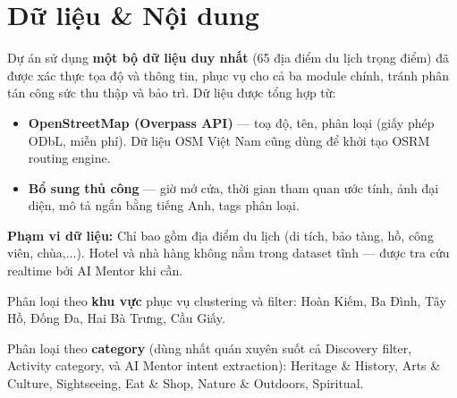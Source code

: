 \documentclass[12pt,a4paper]{article}
\begin{document}
\section{Dữ liệu \& Nội dung}

Dự án sử dụng \textbf{một bộ dữ liệu duy nhất} (65 địa điểm du lịch trọng điểm)
đã được xác thực tọa độ và thông tin, phục vụ cho cả ba module chính, tránh phân
tán công sức thu thập và bảo trì. Dữ liệu được tổng hợp từ:

\begin{itemize}
  \item \textbf{OpenStreetMap (Overpass API)} --- toạ độ, tên, phân loại
        (giấy phép ODbL, miễn phí). Dữ liệu OSM Việt Nam cũng dùng để khởi
        tạo OSRM routing engine.
  \item \textbf{Bổ sung thủ công} --- giờ mở cửa, thời gian tham quan ước
        tính, ảnh đại diện, mô tả ngắn bằng tiếng Anh, tags phân loại.
\end{itemize}

\textbf{Phạm vi dữ liệu:} Chỉ bao gồm địa điểm du lịch (di tích, bảo tàng,
hồ, công viên, chùa,...). Hotel và nhà hàng không nằm trong dataset tĩnh ---
được tra cứu realtime bởi AI Mentor khi cần.

\medskip
Phân loại theo \textbf{khu vực} phục vụ clustering và filter:
Hoàn Kiếm, Ba Đình, Tây Hồ, Đống Đa, Hai Bà Trưng, Cầu Giấy.

\medskip
Phân loại theo \textbf{category} (dùng nhất quán xuyên suốt cả Discovery
filter, Activity category, và AI Mentor intent extraction):
Heritage \& History, Arts \& Culture, Sightseeing, Eat \& Shop,
Nature \& Outdoors, Spiritual.
\end{document}
